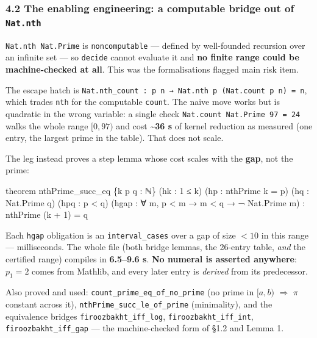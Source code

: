 \documentclass[
  a4paper,
  11pt]{article}
\newenvironment{Shaded}{}{}
\newcommand{\NormalTok}[1]{#1}
\begin{document}
\subsubsection{\texorpdfstring{4.2 The enabling engineering: a
computable bridge out of
\texttt{Nat.nth}}{4.2 The enabling engineering: a computable bridge out of Nat.nth}}\label{42-the-enabling-engineering-a-computable-bridge-out-of-natnth}

\texttt{Nat.nth\ Nat.Prime} is \texttt{noncomputable} --- defined by
well-founded recursion over an infinite set --- so \texttt{decide}
cannot evaluate it and \textbf{no finite range could be machine-checked
at all}. This was the formalisation\textquotesingle s flagged main risk
item.

The escape hatch is
\texttt{Nat.nth\_count\ :\ p\ n\ →\ Nat.nth\ p\ (Nat.count\ p\ n)\ =\ n},
which trades \texttt{nth} for the computable \texttt{count}. The naive
move works but is quadratic in the wrong variable: a single check
\texttt{Nat.count\ Nat.Prime\ 97\ =\ 24} walks the whole range
\([0,97)\) and cost \textbf{\textasciitilde36 s} of kernel reduction as
measured (one entry, the largest prime in the table). That does not
scale.

The leg instead proves a step lemma whose cost scales with the
\textbf{gap}, not the prime:

\begin{Shaded}
\begin{Highlighting}[]
\NormalTok{theorem nthPrime\_succ\_eq \{k p q : ℕ\} (hk : 1 ≤ k) (hp : nthPrime k = p) (hq : Nat.Prime q)}
\NormalTok{    (hpq : p \textless{} q) (hgap : ∀ m, p \textless{} m → m \textless{} q → ¬ Nat.Prime m) :}
\NormalTok{    nthPrime (k + 1) = q}
\end{Highlighting}
\end{Shaded}

Each \texttt{hgap} obligation is an \texttt{interval\_cases} over a gap
of size \(< 10\) in this range --- milliseconds. The whole file (both
bridge lemmas, the 26-entry table, \emph{and} the certified range)
compiles in \textbf{6.5--9.6 s}. \textbf{No numeral is asserted
anywhere}: \(p_1 = 2\) comes from Mathlib, and every later entry is
\emph{derived} from its predecessor.

Also proved and used: \texttt{count\_prime\_eq\_of\_no\_prime} (no prime
in \([a,b)\) \(\Rightarrow\) \(\pi\) constant across it),
\texttt{nthPrime\_succ\_le\_of\_prime} (minimality), and the equivalence
bridges \texttt{firoozbakht\_iff\_log}, \texttt{firoozbakht\_iff\_int},
\texttt{firoozbakht\_iff\_gap} --- the machine-checked form of §1.2 and
Lemma 1.
\end{document}
